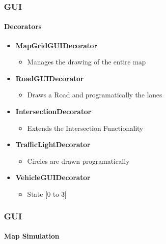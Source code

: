 \documentclass{beamer}
\begin{document}
\begin{frame}
\frametitle{GUI}
\framesubtitle{Decorators}

\begin{itemize}
\item \textbf{MapGridGUIDecorator}
\begin{itemize}
\item Manages the drawing of the entire map
\newline
\end{itemize}
\item \textbf{RoadGUIDecorator}
\begin{itemize}
\item Draws a Road and programatically the lanes
\newline
\end{itemize}
\item \textbf{IntersectionDecorator}
\begin{itemize}
\item Extends the Intersection Functionality 
\newline
\end{itemize}
\item \textbf{TrafficLightDecorator}
\begin{itemize}
\item Circles are drawn programatically
\newline
\end{itemize}
\item \textbf{VehicleGUIDecorator}
\begin{itemize}
\item State [0 to 3]  
\newline
\end{itemize}
\end{itemize}

\end{frame}

\begin{frame}
\frametitle{GUI}
\framesubtitle{Map Simulation}

\begin{center}
\end{center}

\end{frame}
\end{document}
